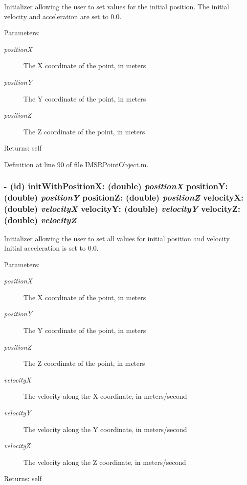Initializer allowing the user to set values for the initial position. The initial velocity and acceleration are set to 0.0.

\begin{Desc}
\item[Parameters:]
\begin{description}
\item[{\em positionX}]The X coordinate of the point, in meters \item[{\em positionY}]The Y coordinate of the point, in meters \item[{\em positionZ}]The Z coordinate of the point, in meters\end{description}
\end{Desc}
\begin{Desc}
\item[Returns:]self \end{Desc}


Definition at line 90 of file IMSRPointObject.m.\hypertarget{interface_i_m_s_r_point_object_4ed4386983dba714a6678023ac353199}{
\subsubsection[{initWithPositionX:positionY:positionZ:velocityX:velocityY:velocityZ:}]{\setlength{\rightskip}{0pt plus 5cm}- (id) initWithPositionX: (double) {\em positionX}\/ positionY: (double) {\em positionY}\/ positionZ: (double) {\em positionZ}\/ velocityX: (double) {\em velocityX}\/ velocityY: (double) {\em velocityY}\/ velocityZ: (double) {\em velocityZ}}}
\label{interface_i_m_s_r_point_object_4ed4386983dba714a6678023ac353199}


Initializer allowing the user to set all values for initial position and velocity. Initial acceleration is set to 0.0.

\begin{Desc}
\item[Parameters:]
\begin{description}
\item[{\em positionX}]The X coordinate of the point, in meters \item[{\em positionY}]The Y coordinate of the point, in meters \item[{\em positionZ}]The Z coordinate of the point, in meters \item[{\em velocityX}]The velocity along the X coordinate, in meters/second \item[{\em velocityY}]The velocity along the Y coordinate, in meters/second \item[{\em velocityZ}]The velocity along the Z coordinate, in meters/second\end{description}
\end{Desc}
\begin{Desc}
\item[Returns:]self \end{Desc}


